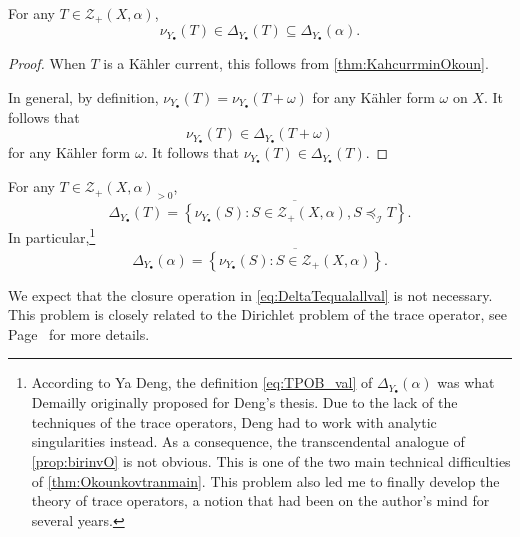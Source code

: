\begin{corollary}\label{cor:valuationcurrentinPOB}
For any $T\in \mathcal{Z}_+(X,\alpha)$,
\[
\nu_{Y_{\bullet}}(T)\in \Delta_{Y_{\bullet}}(T)\subseteq \Delta_{Y_{\bullet}}(\alpha).
\]
\end{corollary}
\begin{proof}
    When $T$ is a Kähler current, this follows from \cref{thm:KahcurrminOkoun}.

    In general, by definition, $\nu_{Y_{\bullet}}(T)=\nu_{Y_{\bullet}}(T+\omega)$ for any Kähler form $\omega$ on $X$. It follows that
    \[
    \nu_{Y_{\bullet}}(T)\in \Delta_{Y_{\bullet}}(T+\omega)
    \]
    for any Kähler form $\omega$. It follows that $\nu_{Y_{\bullet}}(T)\in \Delta_{Y_{\bullet}}(T)$.
\end{proof}


\begin{theorem}\label{thm:Deltapartialint}
    For any $T\in \mathcal{Z}_+(X,\alpha)_{>0}$,
    \begin{equation}\label{eq:DeltaTequalallval}
    \Delta_{Y_{\bullet}}(T)=\overline{\left\{\nu_{Y_{\bullet}}(S):S\in \mathcal{Z}_+(X,\alpha),S\preceq_{\mathcal{I}}T\right\}}.
    \end{equation}
    In particular,\footnote{According to Ya Deng, the definition \eqref{eq:TPOB_val} of $\Delta_{Y_{\bullet}}(\alpha)$ was what Demailly originally proposed for Deng's thesis. Due to the lack of the techniques of the trace operators, Deng had to work with analytic singularities instead. As a consequence, the transcendental analogue of \cref{prop:birinvO} is not obvious. This is one of the two main technical difficulties of \cref{thm:Okounkovtranmain}. This problem also led me to finally develop the theory of trace operators, a notion that had been on the author's mind for several years.}
    \begin{equation}\label{eq:TPOB_val}
    \Delta_{Y_{\bullet}}(\alpha)=\overline{\left\{\nu_{Y_{\bullet}}(S):S\in \mathcal{Z}_+(X,\alpha)\right\}}.
    \end{equation}
\end{theorem}

\begin{remark}\label{rmk:Okounkov:L1841}
We expect that the closure operation in \eqref{eq:DeltaTequalallval} is not necessary. This problem is closely related to the Dirichlet problem of the trace operator, see Page~\pageref{conj:exttracegeneral} for more details.
\end{remark}


